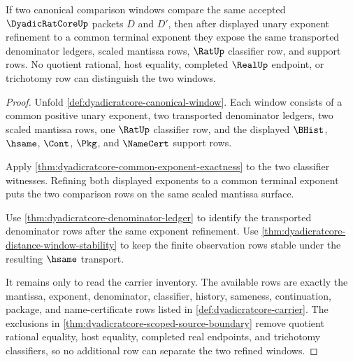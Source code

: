 \begin{theorem}
\label{thm:dyadicratcore-canonical-window-uniqueness}
If two canonical comparison windows compare the same accepted
$\DyadicRatCoreUp$ packets $D$ and $D'$, then after displayed unary exponent
refinement to a common terminal exponent they expose the same transported
denominator ledgers, scaled mantissa rows, $\RatUp$ classifier row, and
support rows. No quotient rational, host equality, completed $\RealUp$
endpoint, or trichotomy row can distinguish the two windows.
\end{theorem}
\begin{proof}
Unfold \autoref{def:dyadicratcore-canonical-window}. Each window consists of
a common positive unary exponent, two transported denominator ledgers, two
scaled mantissa rows, one $\RatUp$ classifier row, and the displayed
$\BHist$, $\hsame$, $\Cont$, $\Pkg$, and $\NameCert$ support rows.

Apply \autoref{thm:dyadicratcore-common-exponent-exactness} to the two
classifier witnesses. Refining both displayed exponents to a common terminal
exponent puts the two comparison rows on the same scaled mantissa surface.

Use \autoref{thm:dyadicratcore-denominator-ledger} to identify the transported
denominator rows after the same exponent refinement. Use
\autoref{thm:dyadicratcore-distance-window-stability} to keep the finite
observation rows stable under the resulting $\hsame$ transport.

It remains only to read the carrier inventory. The available rows are exactly
the mantissa, exponent, denominator, classifier, history, sameness,
continuation, package, and name-certificate rows listed in
\autoref{def:dyadicratcore-carrier}. The exclusions in
\autoref{thm:dyadicratcore-scoped-source-boundary} remove quotient rational
equality, host equality, completed real endpoints, and trichotomy classifiers,
so no additional row can separate the two refined windows.
\end{proof}

